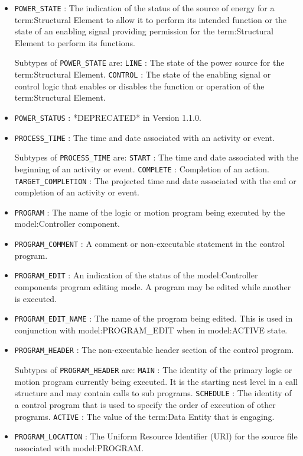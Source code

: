 \begin{itemize}
\item \texttt{POWER_STATE} : The indication of the status of the source of energy for a {term:Structural Element} to allow it to perform its intended function or the state of an enabling signal providing permission for the {term:Structural Element} to perform its functions. 

Subtypes of \texttt{POWER_STATE} are: 
\newline\tab \texttt{LINE} : The state of the power source for the {term:Structural Element}. 
\newline\tab \texttt{CONTROL} : The state of the enabling signal or control logic that enables or disables the function or operation of the {term:Structural Element}. 
\item \texttt{POWER_STATUS} : *DEPRECATED* in Version 1.1.0. 

\item \texttt{PROCESS_TIME} : The time and date associated with an activity or event. 

Subtypes of \texttt{PROCESS_TIME} are: 
\newline\tab \texttt{START} : The time and date associated with the beginning of an activity or event. 
\newline\tab \texttt{COMPLETE} : Completion of an action. 
\newline\tab \texttt{TARGET_COMPLETION} : The projected time and date associated with the end or completion of an activity or event. 
\item \texttt{PROGRAM} : The name of the logic or motion program being executed by the {model:Controller} component. 

\item \texttt{PROGRAM_COMMENT} : A comment or non-executable statement in the control program. 

\item \texttt{PROGRAM_EDIT} : An indication of the status of the {model:Controller} components program editing mode. A program may be edited while another is executed. 

\item \texttt{PROGRAM_EDIT_NAME} : The name of the program being edited. 
 This is used in conjunction with {model:PROGRAM_EDIT} when in {model:ACTIVE} state.  

\item \texttt{PROGRAM_HEADER} : The non-executable header section of the control program. 

Subtypes of \texttt{PROGRAM_HEADER} are: 
\newline\tab \texttt{MAIN} : The identity of the primary logic or motion program currently being executed. It is the starting nest level in a call structure and may contain calls to sub programs. 
\newline\tab \texttt{SCHEDULE} : The identity of a control program that is used to specify the order of execution of other programs. 
\newline\tab \texttt{ACTIVE} : The value of the {term:Data Entity} that is engaging. 
\item \texttt{PROGRAM_LOCATION} : The Uniform Resource Identifier (URI) for the source file associated with {model:PROGRAM}. 


\end{itemize}
